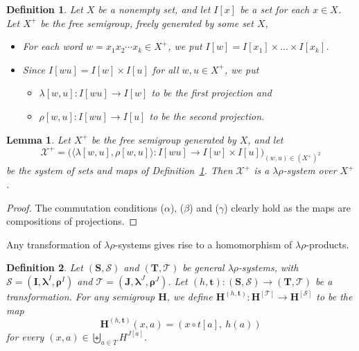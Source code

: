 \documentclass{amsart}
\newtheorem{lemma}{Lemma}
\newtheorem{definition}{Definition}
\begin{document}
\begin{definition}\label{over-free-sgrp}
Let $X$ be a nonempty set, and let $I[x]$ be a set for each $x\in X$.
Let $X^+$ be the free semigroup, freely generated by some set $X$,
\begin{itemize}
\item For each word $w = x_1x_2\cdots x_k\in X^+$,   
we put $I[w] = I[{x_1}] \times \dots \times I[{x_k}]$.
\item Since $I[wu] = I[w]\times I[u]$ for all $w,u\in X^+$,  we put
\begin{itemize}  
\item $\lambda[w,u]\colon I[wu] \to I[w]$ to be the first projection and
\item $\rho[w,u]\colon I[wu] \to I[u]$ to be the second projection.
\end{itemize}
\end{itemize}
\end{definition}


\begin{lemma}\label{free-is-free}
Let\/  $X^+$ be the free semigroup generated by $X$, and let
$$
\mathcal{X}^+ = \bigl(\langle \lambda[w,u],\rho[w,u]\rangle\colon
I[wu]\longrightarrow I[w]\times I[u]\bigr)_{(w,u)\in (X^+)^2}
$$
be the system of sets and maps of Definition~\ref{over-free-sgrp}. Then
$\mathcal{X}^+$ is a $\lambda\rho$-system over $X^+$.
\end{lemma}

\begin{proof}
The commutation conditions ($\alpha$), ($\beta$) and ($\gamma$) 
clearly hold as the maps are compositions of projections. 
\end{proof}


Any transformation of $\lambda\rho$-systems gives rise
to a homomorphism of $\lambda\rho$-products. 


\begin{definition}\label{hom-from-trans}
Let $(\mathbf{S},\mathcal{S})$ and
$(\mathbf{T},\mathcal{T})$ be general $\lambda\rho$-systems, with
$\mathcal{S} =  (\mathbf{I}, \boldsymbol{\lambda}^I, 
\boldsymbol{\rho}^I)$ and $\mathcal{T} = (\mathbf{J}, 
\boldsymbol{\lambda}^J, \boldsymbol{\rho}^J)$.
Let $(h, \mathbf{t})\colon (\mathbf{S},\mathcal{S})\to
(\mathbf{T},\mathcal{T})$ be a transformation.
For any semigroup $\mathbf{H}$, we define
$\mathbf{H}^{(h,\mathbf{t})}\colon 
\mathbf{H}^{[\mathcal{T}]} \to \mathbf{H}^{[\mathcal{S}]}$ to be the map 
$$
\mathbf{H}^{(h, \mathbf{t})}(x,a) = (x\circ t[a],\ h(a))
$$
for every $(x,a)\in\biguplus_{a\in T} H^{J[a]}$. 
\end{definition}  
\end{document}
